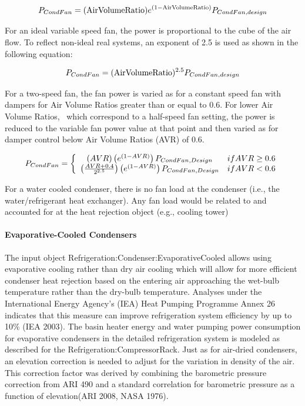 \begin{equation}
{P_{CondFan}} = ({\rm{Air Volume Ratio}}){e^{(1 - {\rm{Air Volume Ratio}})}}{P_{CondFan,design}}
\end{equation}

For an ideal variable speed fan, the power is proportional to the cube of the air flow. To reflect non-ideal real systems, an exponent of 2.5 is used as shown in the following equation:

\begin{equation}
{P_{CondFan}} = {({\rm{Air Volume Ratio}})^{2.5}}{P_{CondFan,design}}
\end{equation}

For a two-speed fan, the fan power is varied as for a constant speed fan with dampers for Air Volume Ratios greater than or equal to 0.6. For lower Air Volume Ratios,~ which correspond to a half-speed fan setting, the power is reduced to the variable fan power value at that point and then varied as for damper control below Air Volume Ratios (AVR) of 0.6.

\begin{equation}
  P_{CondFan} = \left\{ \begin{array}{cr}
                          \PB{AVR}\PB{e^{\PB{1-AVR}}}P_{CondFan,Design} & if AVR \geq 0.6 \\
                          \PB{\frac{AVR+0.4}{2^{2.5}}}\PB{e^{\PB{1-AVR}}}P_{CondFan,Design} & if AVR < 0.6
                        \end{array}
                \right.
\end{equation}

For a water cooled condenser, there is no fan load at the condenser (i.e., the~ water/refrigerant heat exchanger). Any fan load would be related to and accounted for at the heat rejection object (e.g., cooling tower)

\paragraph{Evaporative-Cooled Condensers}\label{evaporative-cooled-condensers}

The input object Refrigeration:Condenser:EvaporativeCooled allows using evaporative cooling rather than dry air cooling which will allow for more efficient condenser heat rejection based on the entering air approaching the wet-bulb temperature rather than the dry-bulb temperature. Analyses under the International Energy Agency's (IEA) Heat Pumping Programme Annex 26 indicates that this measure can improve refrigeration system efficiency by up to 10\% (IEA 2003). The basin heater energy and water pumping power consumption for evaporative condensers in the detailed refrigeration system is modeled as described for the Refrigeration:CompressorRack. Just as for air-dried condensers, an elevation correction is needed to adjust for the variation in density of the air. This correction factor was derived by combining the barometric pressure correction from ARI 490 and a standard correlation for barometric pressure as a function of elevation(ARI 2008, NASA 1976).

